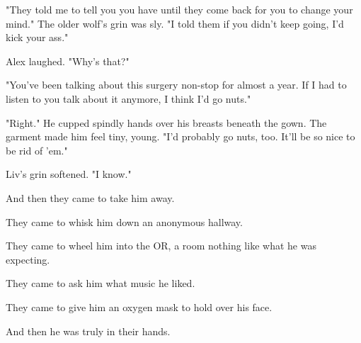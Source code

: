 "They told me to tell you you have until they come back for you to change your mind." The older wolf's grin was sly. "I told them if you didn't keep going, I'd kick your ass."

Alex laughed. "Why's that?"

"You've been talking about this surgery non-stop for almost a year. If I had to listen to you talk about it anymore, I think I'd go nuts."

"Right." He cupped spindly hands over his breasts beneath the gown. The garment made him feel tiny, young. "I'd probably go nuts, too. It'll be so nice to be rid of 'em."

Liv's grin softened. "I know."

And then they came to take him away.

They came to whisk him down an anonymous hallway.

They came to wheel him into the OR, a room nothing like what he was expecting.

They came to ask him what music he liked.

They came to give him an oxygen mask to hold over his face.

And then he was truly in their hands.
